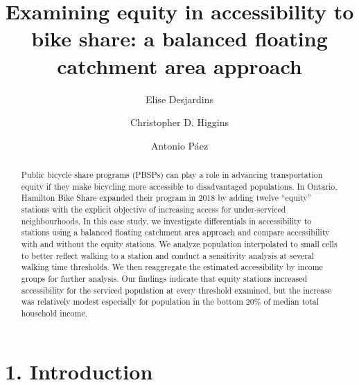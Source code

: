 \documentclass[]{elsarticle} %
\begin{document}
\begin{frontmatter}

  \title{Examining equity in accessibility to bike share: a balanced
floating catchment area approach}
    \author[McMaster University]{Elise Desjardins}
    \author[University of Toronto Scarborough]{Christopher D. Higgins}
    \author[McMaster University]{Antonio Páez}
      \address[McMaster University]{School of Earth, Environment \&
Society, McMaster University, 1280 Main Street West, Hamilton, ON
L8S4L8}
    \address[University of Toronto Scarborough]{Department of Geography
\& Planning, University of Toronto Scarborough, 1265 Military Trail,
Toronto, ON M1C1A4}
  
  \begin{abstract}
  Public bicycle share programs (PBSPs) can play a role in advancing
  transportation equity if they make bicycling more accessible to
  disadvantaged populations. In Ontario, Hamilton Bike Share expanded
  their program in 2018 by adding twelve ``equity'' stations with the
  explicit objective of increasing access for under-serviced
  neighbourhoods. In this case study, we investigate differentials in
  accessibility to stations using a balanced floating catchment area
  approach and compare accessibility with and without the equity
  stations. We analyze population interpolated to small cells to better
  reflect walking to a station and conduct a sensitivity analysis at
  several walking time thresholds. We then reaggregate the estimated
  accessibility by income groups for further analysis. Our findings
  indicate that equity stations increased accessibility for the serviced
  population at every threshold examined, but the increase was
  relatively modest especially for population in the bottom 20\% of
  median total household income.
  \end{abstract}
  
 \end{frontmatter}

\newpage

\hypertarget{introduction}{%
\section{1. Introduction}\label{introduction}}
\end{document}
